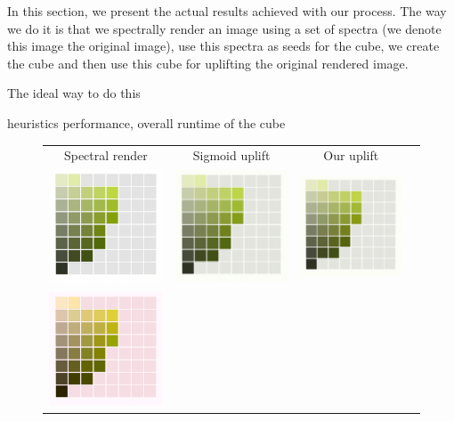 In this section, we present the actual results achieved with our process. The way we do it is that
we spectrally render an image using a set of spectra (we denote this image the original image), use this spectra as seeds for the cube, we create the cube and then use this cube for uplifting the original rendered image. 

The ideal way to do this

heuristics performance, overall runtime of the cube


\begin{figure}[t]
	\centering
	{\sffamily
		\begin{tabular}{cccc}
			Spectral render & Sigmoid uplift & Our uplift
			\vspace{1em} \\
			\includegraphics[width=.30\linewidth]{img/results_art_page14_originalD65.png}
			&
			\includegraphics[width=.30\linewidth]{img/results_art_page14_sigmoidD65.png}
			& 
			\includegraphics[width=.30\linewidth]{img/results_art_page14_ourD65.png}
			\vspace{1em} \\
			\includegraphics[width=.30\linewidth]{img/results_art_page14_originalFL11.png}

\end{tabular}}
\end{figure}
